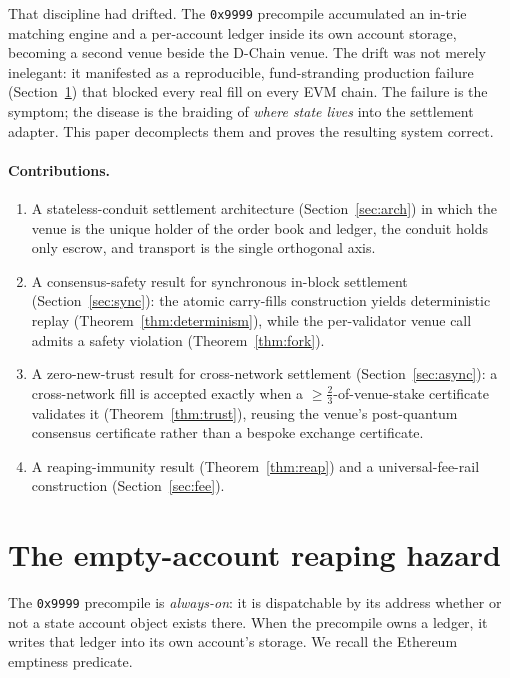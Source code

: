\documentclass[11pt,a4paper]{article}
\begin{document}
That discipline had drifted. The \texttt{0x9999} precompile accumulated an in-trie matching engine
and a per-account ledger inside its own account storage, becoming a second venue beside the
D-Chain venue. The drift was not merely inelegant: it manifested as a reproducible,
fund-stranding production failure (Section~\ref{sec:reaping}) that blocked every real fill on every
EVM chain. The failure is the symptom; the disease is the braiding of \emph{where state lives}
into the settlement adapter. This paper decomplects them and proves the resulting system correct.

\paragraph{Contributions.}
\begin{enumerate}
\item A stateless-conduit settlement architecture (Section~\ref{sec:arch}) in which the venue is
      the unique holder of the order book and ledger, the conduit holds only escrow, and transport
      is the single orthogonal axis.
\item A consensus-safety result for synchronous in-block settlement
      (Section~\ref{sec:sync}): the atomic carry-fills construction yields deterministic replay
      (Theorem~\ref{thm:determinism}), while the per-validator venue call admits a safety violation
      (Theorem~\ref{thm:fork}).
\item A zero-new-trust result for cross-network settlement (Section~\ref{sec:async}): a
      cross-network fill is accepted exactly when a $\geq\!\tfrac{2}{3}$-of-venue-stake certificate
      validates it (Theorem~\ref{thm:trust}), reusing the venue's post-quantum consensus
      certificate rather than a bespoke exchange certificate.
\item A reaping-immunity result (Theorem~\ref{thm:reap}) and a universal-fee-rail construction
      (Section~\ref{sec:fee}).
\end{enumerate}

\section{The empty-account reaping hazard}
\label{sec:reaping}

The \texttt{0x9999} precompile is \emph{always-on}: it is dispatchable by its address whether or
not a state account object exists there. When the precompile owns a ledger, it writes that ledger
into its own account's storage. We recall the Ethereum emptiness predicate.
\end{document}
